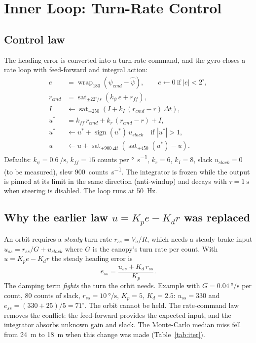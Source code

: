 \documentclass[11pt,a4paper]{article}
\newcommand{\wrap}{\operatorname{wrap}}
\newcommand{\sat}{\operatorname{sat}}
\begin{document}
\section{Inner Loop: Turn-Rate Control}

\subsection{Control law}
The heading error is converted into a turn-rate command, and the gyro closes
a rate loop with feed-forward and integral action:
\begin{align}
  e &= \wrap_{180}(\psi_{cmd} - \hat\psi), \qquad e \leftarrow 0 \ \text{if}\ |e| < 2^\circ,\\
  r_{cmd} &= \sat_{\pm 22^\circ/s}\!\left(k_\psi\, e + r_{ff}\right),\\
  I &\leftarrow \sat_{\pm 250}\!\left(I + k_I\,(r_{cmd} - r)\,\Delta t\right),\\
  u^\ast &= k_{ff}\, r_{cmd} + k_r\,(r_{cmd} - r) + I,\\
  u^\ast &\leftarrow u^\ast + \operatorname{sign}(u^\ast)\, u_{slack} \quad \text{if } |u^\ast| > 1,\\
  u &\leftarrow u + \sat_{\pm 900\,\Delta t}\!\left(\sat_{\pm 450}(u^\ast) - u\right).
\end{align}
Defaults: $k_\psi = 0.6\ \si{\per\second}$, $k_{ff} = 15$ counts per
\si{\degree\per\second}, $k_r = 6$, $k_I = 8$, slack $u_{slack} = 0$ (to be
measured), slew \SI{900}{counts\per\second}. The integrator is frozen while
the output is pinned at its limit in the same direction (anti-windup) and
decays with $\tau = \SI{1}{\second}$ when steering is disabled. The loop runs
at \SI{50}{\hertz}.

\subsection{Why the earlier law $u = K_p e - K_d r$ was replaced}
An orbit requires a \emph{steady} turn rate $r_{ss} = V_a/R$, which needs a
steady brake input $u_{ss} = r_{ss}/G + u_{slack}$ where $G$ is the canopy's
turn rate per count. With $u = K_p e - K_d r$ the steady heading error is
\begin{equation}
  e_{ss} = \frac{u_{ss} + K_d\, r_{ss}}{K_p}.
\end{equation}
The damping term \emph{fights} the turn the orbit needs. Example with
$G = \SI{0.04}{\degree\per\second}$ per count, 80 counts of slack,
$r_{ss} = \SI{10}{\degree\per\second}$, $K_p = 5$, $K_d = 2.5$:
$u_{ss} = 330$ and $e_{ss} = (330 + 25)/5 = 71^\circ$. The orbit cannot be
held. The rate-command law removes the conflict: the feed-forward provides
the expected input, and the integrator absorbs unknown gain and slack. The
Monte-Carlo median miss fell from \SI{24}{\meter} to \SI{18}{\meter} when this
change was made (Table~\ref{tab:iter}).
\end{document}

